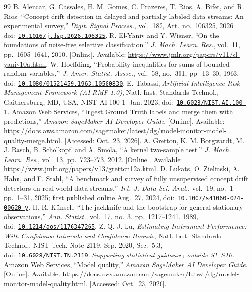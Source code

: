 \documentclass[11pt,a4paper]{article}
\begin{document}
\begin{thebibliography}{99}
 B. Alencar, G. Cassales, H. M. Gomes, C. Prazeres, T. Rios, A. Bifet, and R. Rios, ``Concept drift detection in delayed and partially labeled data streams: An experimental survey,'' \emph{Digit. Signal Process.}, vol.~182, Art.~no.~106325, 2026, doi:~\href{https://doi.org/10.1016/j.dsp.2026.106325}{\nolinkurl{10.1016/j.dsp.2026.106325}}.
 R. El-Yaniv and Y. Wiener, ``On the foundations of noise-free selective classification,'' \emph{J. Mach. Learn. Res.}, vol.~11, pp.~1605--1641, 2010. [Online]. Available: \url{https://www.jmlr.org/papers/v11/el-yaniv10a.html}.
 W. Hoeffding, ``Probability inequalities for sums of bounded random variables,'' \emph{J. Amer. Statist. Assoc.}, vol.~58, no.~301, pp.~13--30, 1963, doi:~\href{https://doi.org/10.1080/01621459.1963.10500830}{\nolinkurl{10.1080/01621459.1963.10500830}}.
 E. Tabassi, \emph{Artificial Intelligence Risk Management Framework (AI RMF 1.0)}, Natl. Inst. Standards Technol., Gaithersburg, MD, USA, NIST AI 100-1, Jan. 2023, doi:~\href{https://doi.org/10.6028/NIST.AI.100-1}{\nolinkurl{10.6028/NIST.AI.100-1}}.
 Amazon Web Services, ``Ingest Ground Truth labels and merge them with predictions,'' \emph{Amazon SageMaker AI Developer Guide}. [Online]. Available: \url{https://docs.aws.amazon.com/sagemaker/latest/dg/model-monitor-model-quality-merge.html}. [Accessed: Oct.~23, 2026].
 A. Gretton, K. M. Borgwardt, M. J. Rasch, B. Sch\"olkopf, and A. Smola, ``A kernel two-sample test,'' \emph{J. Mach. Learn. Res.}, vol.~13, pp.~723--773, 2012. [Online]. Available: \url{https://www.jmlr.org/papers/v13/gretton12a.html}.
 D. Lukats, O. Zielinski, A. Hahn, and F. Stahl, ``A benchmark and survey of fully unsupervised concept drift detectors on real-world data streams,'' \emph{Int. J. Data Sci. Anal.}, vol.~19, no.~1, pp.~1--31, 2025; first published online Aug.~27, 2024, doi:~\href{https://doi.org/10.1007/s41060-024-00620-y}{\nolinkurl{10.1007/s41060-024-00620-y}}.
 H. R. K\"unsch, ``The jackknife and the bootstrap for general stationary observations,'' \emph{Ann. Statist.}, vol.~17, no.~3, pp.~1217--1241, 1989, doi:~\href{https://doi.org/10.1214/aos/1176347265}{\nolinkurl{10.1214/aos/1176347265}}.
 Z.-Q. J. Lu, \emph{Estimating Instrument Performance: With Confidence Intervals and Confidence Bounds}, Natl. Inst. Standards Technol., NIST Tech. Note 2119, Sep. 2020, Sec.~5.3, doi:~\href{https://doi.org/10.6028/NIST.TN.2119}{\nolinkurl{10.6028/NIST.TN.2119}}. \emph{Supporting statistical guidance; outside S1--S10.}
 Amazon Web Services, ``Model quality,'' \emph{Amazon SageMaker AI Developer Guide}. [Online]. Available: \url{https://docs.aws.amazon.com/sagemaker/latest/dg/model-monitor-model-quality.html}. [Accessed: Oct.~23, 2026].
\end{thebibliography}
\end{document}
